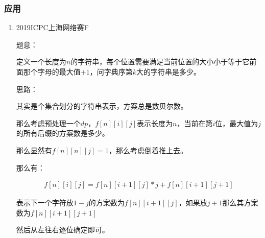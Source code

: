 \subsubsection{应用}
\begin{enumerate}
\item 2019ICPC上海网络赛F\par
题意：\par
定义一个长度为$n$的字符串，每个位置需要满足当前位置的大小小于等于它前面那个字母的最大值$+1$，问字典序第$k$大的字符串是多少。\par

思路：\par
其实是个集合划分的字符串表示，方案总是数贝尔数。\par
那么考虑预处理一个$dp$，$f[n][i][j]$表示长度为$n$，当前在第$i$位，最大值为$j$的所有后缀的方案数是多少。\par
那么显然有$f[n][n][j] = 1$，那么考虑倒着推上去。\par
那么有：\par
\begin{eqnarray*}
f[n][i][j] = f[n][i +1][j] * j + f[n][i + 1][j + 1]
\end{eqnarray*}\par
表示下一个字符放$1 - j$的方案数为$f[n][i + 1][j]$，如果放$j + 1$那么其方案数为$f[n][i + 1][j + 1]$\par
然后从左往右逐位确定即可。\par
\end{enumerate}

